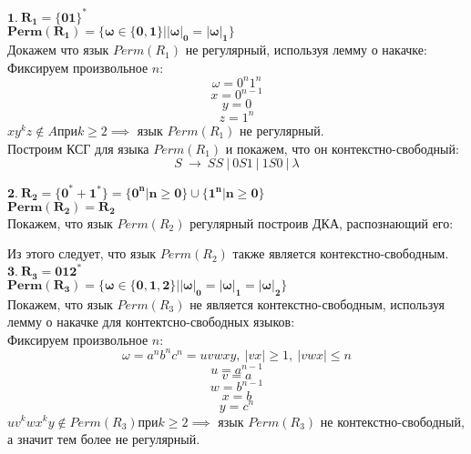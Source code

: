 \documentclass[12pt]{article}
\begin{document}
	$\boldsymbol{1.\ R_1 = \{01\}^*}$\\
	$\boldsymbol{Perm(R_1) = \{\omega \in \{ 0, 1 \} \vert |\omega|_0 = |\omega|_1 \}}$\\
	Докажем что язык $Perm(R_1)$ не регулярный, используя лемму о накачке:\\
	Фиксируем произвольное $n$:
	$$\omega = 0^n1^n$$
	$$x = 0^{n-1}$$
	$$y = 0$$
	$$z = 1^n$$
	$xy^kz \notin A при k \geq 2 \implies$ язык $Perm(R_1)$ не регулярный.\\
	Построим КСГ для языка $Perm(R_1)$ и покажем, что он контекстно-свободный:
	$$S\ \to\ SS\ \vert\ 0S1\ \vert\ 1S0\ \vert\ \lambda$$
	 
	 $\boldsymbol{2.\ R_2 = \{0^* + 1^*\} = \{ 0^n \vert n \geq 0 \} \cup \{ 1^n \vert n \geq 0 \}}$\\
	 $\boldsymbol{Perm(R_2) = R_2}$\\
	 Покажем, что язык $Perm(R_2)$ регулярный построив ДКА, распознающий его:
	 \begin{center}
	 \end{center}
	 Из этого следует, что язык $Perm(R_2)$ также является контекстно-свободным.\\
	 
	 $\boldsymbol{3.\ R_3 = {012}^*}$\\
	 $\boldsymbol{Perm(R_3) = \{\omega \in \{ 0, 1, 2 \} \vert |\omega|_0 = |\omega|_1 = |\omega|_2 \}}$\\
	 Покажем, что язык $Perm(R_3)$ не является контекстно-свободным, используя лемму о накачке для контектсно-свободных языков:\\
	 Фиксируем произвольное $n$:
	 $$\omega = a^nb^nc^n=uvwxy,\ |vx| \geq 1,\ |vwx| \leq n$$
	 $$u = a^{n-1}$$
	 $$v = a$$
	 $$w = b^{n-1}$$
	 $$x = b$$
	 $$y=c^n$$
	 $uv^kwx^ky \notin Perm(R_3) при k \geq 2 \implies$ язык $Perm(R_3)$ не контекстно-свободный, а значит тем более не регулярный.\\ 
	 
\end{document}
